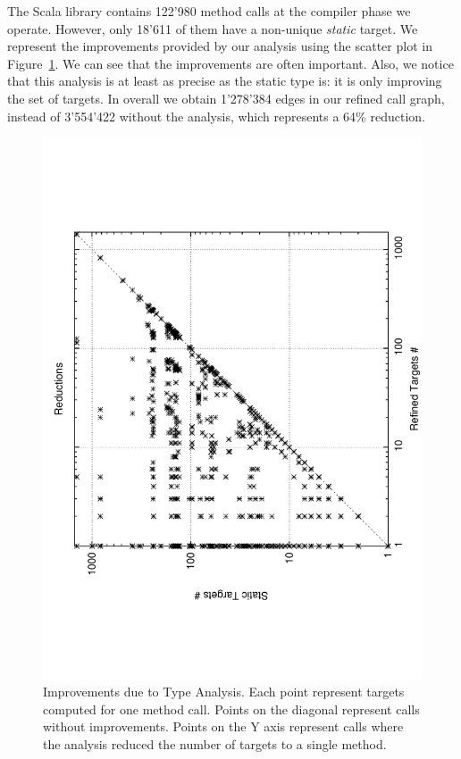 \documentclass[a4paper]{article}
\begin{document}
The Scala library contains 122'980 method calls at the compiler phase we
operate. However, only 18'611 of them have a non-unique \emph{static} target.
We represent the improvements provided by our analysis using the scatter plot
in Figure~\ref{fig:scatter}. We can see that the improvements are often
important. Also, we notice that this analysis is at least as precise as the
static type is: it is only improving the set of targets. In overall we obtain
1'278'384 edges in our refined call graph, instead of 3'554'422 without the
analysis, which represents a 64\% reduction.

\begin{figure}[h]
    \begin{center}
    \includegraphics[scale=0.6]{images/scatter}
    \end{center}
    \caption{Improvements due to Type Analysis. Each point represent targets
    computed for one method call. Points on the diagonal represent calls
    without improvements. Points on the Y axis represent calls where the
    analysis reduced the number of targets to a single method.}
    \label{fig:scatter}
\end{figure}
\end{document}
